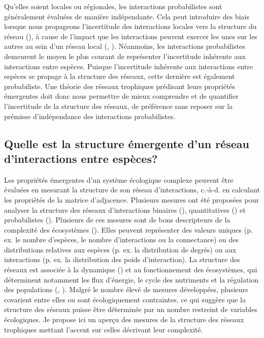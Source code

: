 Qu'elles soient locales ou régionales, les interactions probabilistes sont
généralement évaluées de manière indépendante. Cela peut introduire des biais
lorsque nous propageons l'incertitude des interactions locales vers la structure
du réseau (\cite{Poisot2016Structure}), à cause de l'impact que les interactions
peuvent exercer les unes sur les autres au sein d'un réseau local
(\cite{Golubski2011Modifying}, \cite{Ims2013Indirect}). Néanmoins, les
interactions probabilistes demeurent le moyen le plus courant de représenter
l'incertitude inhérente aux interactions entre espèces. Puisque l'incertitude
inhérente aux interactions entre espèces se propage à la structure des réseaux,
cette dernière est également probabiliste. Une théorie des réseaux trophiques
prédisant leurs propriétés émergentes doit donc nous permettre de mieux
comprendre et de quantifier l'incertitude de la structure des réseaux, de
préférence sans reposer sur la prémisse d'indépendance des interactions
probabilistes.


\subsection{Quelle est la structure émergente d'un réseau d'interactions entre espèces?} 

Les propriétés émergentes d'un système écologique complexe peuvent être évaluées
en mesurant la structure de son réseau d'interactions, c.-à-d. en calculant
les propriétés de la matrice d'adjacence. Plusieurs mesures ont été proposées
pour analyser la structure des réseaux d'interactions binaires
(\cite{Delmas2019Analysing}), quantitatives (\cite{Bersier2002Quantitative}) et
probabilistes (\cite{Poisot2016Structure}). Plusieurs de ces mesures sont de
bons descripteurs de la complexité des écosystèmes (\cite{Landi2018Complexity}).
Elles peuvent représenter des valeurs uniques (p. ex. le nombre d'espèces, le
nombre d'interactions ou la connectance) ou des distributions relatives aux
espèces (p. ex. la distribution de degrés) ou aux interactions (p. ex. la
distribution des poids d'interaction). La structure des réseaux est associée à
la dynamique (\cite{Pascual2006Ecological}) et au fonctionnement des
écosystèmes, qui déterminent notamment les flux d'énergie, le cycle des
nutriments et la régulation des populations (\cite{McCann2011Food},
\cite{Thompson2012Food}). Malgré le nombre élevé de mesures développées,
plusieurs covarient entre elles ou sont écologiquement contraintes, ce qui
suggère que la structure des réseaux puisse être déterminée par un nombre
restreint de variables écologiques. Je propose ici un aperçu des mesures de la
structure des réseaux trophiques mettant l'accent sur celles décrivant leur
complexité. 

